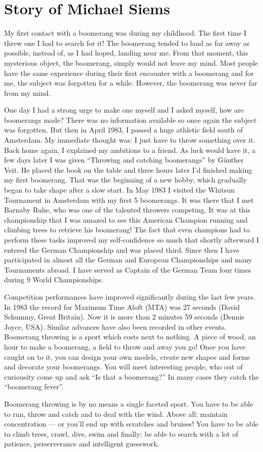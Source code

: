 \section*{Story of Michael Siems}

My first contact with a boomerang was during my childhood. The first time I threw one I had to search for it! The boomerang tended to land as far away as possible, instead of, as I had hoped, landing near me. From that moment, this mysterious object, the boomerang, simply would not leave my mind.
Most people have the same experience during their first encounter with a boomerang and for me, the subject was forgotten for a while. However, the boomerang was never far from my mind. 

One day I had a strong urge to make one myself and I asked myself, how are boomerangs made? There was no information available so once again the subject was forgotten. 
But then in April 1983, I passed a huge athletic field south of Amsterdam. My immediate thought was: I just have to throw something over it. Back home again, I explained my ambitions to a friend. As luck would have it, a few days later I was given ``Throwing and catching boomerangs'' by Günther Veit. He placed the book on the table and three hours later I’d finished making my first boomerang. That was the beginning of a new hobby, which gradually began to take shape after a slow start. In May 1983 I visited the Whitsun Tournament in Amsterdam with my first 5 boomerangs. It was there that I met Barnaby Ruhe, who was one of the talented throwers competing. It was at this championship that I was amazed to see this American Champion running and climbing trees to retrieve his boomerang! The fact that even champions had to perform these tasks improved my self-confidence so much that shortly afterward I entered the German Championship and was placed third. Since then I have participated in almost all the German and European Championships and many Tournaments abroad. I have served as Captain of the German Team four times during 9 World Championships. 

Competition performances have improved significantly during the last few years. In 1983 the record for Maximum Time Aloft (MTA) was 27 seconds (David Schummy, Great Britain). Now it is more than 2 minutes 59 seconds (Dennis Joyce, USA). Similar advances have also been recorded in other events.
\newpage
Boomerang throwing is a sport which costs next to nothing. A piece of wood, an hour to make a boomerang, a field to throw and away you go! Once you have caught on to it, you can design your own models, create new shapes and forms and decorate your boomerangs. You will meet interesting people, who out of curiousity come up and ask ``Is that a boomerang?'' In many cases they catch the ``boomerang fever''. 

Boomerang throwing is by no means a single faceted sport. You have to be able to run, throw and catch and to deal with the wind. Above all: maintain concentration — or you’ll end up with scratches and bruises! You have to be able to climb trees, crawl, dive, swim and finally: be able to search with a lot of patience, perserverance and intelligent guesswork.




